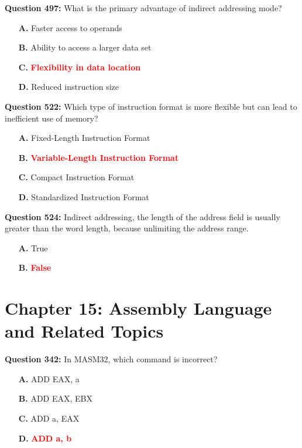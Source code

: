 \documentclass[12pt,a4paper]{article}
\begin{document}
\textbf{Question 497:} What is the primary advantage of indirect addressing mode?

\begin{itemize}
    \item[\textbf{A.}] Faster access to operands
    \item[\textbf{B.}] Ability to access a larger data set
    \item[\textbf{C.}] \textcolor{red}{\textbf{Flexibility in data location}}
    \item[\textbf{D.}] Reduced instruction size
\end{itemize}

\vspace{0.5cm}

\textbf{Question 522:} Which type of instruction format is more flexible but can lead to inefficient use of memory?

\begin{itemize}
    \item[\textbf{A.}] Fixed-Length Instruction Format
    \item[\textbf{B.}] \textcolor{red}{\textbf{Variable-Length Instruction Format}}
    \item[\textbf{C.}] Compact Instruction Format
    \item[\textbf{D.}] Standardized Instruction Format
\end{itemize}

\vspace{0.5cm}

\textbf{Question 524:} Indirect addressing, the length of the address field is usually greater than the word length, because unlimiting the address range.

\begin{itemize}
    \item[\textbf{A.}] True
    \item[\textbf{B.}] \textcolor{red}{\textbf{False}}
\end{itemize}

\vspace{0.5cm}

\section{Chapter 15: Assembly Language and Related Topics}

\textbf{Question 342:} In MASM32, which command is incorrect?

\begin{itemize}
    \item[\textbf{A.}] ADD EAX, a
    \item[\textbf{B.}] ADD EAX, EBX
    \item[\textbf{C.}] ADD a, EAX
    \item[\textbf{D.}] \textcolor{red}{\textbf{ADD a, b}}
\end{itemize}
\end{document}

